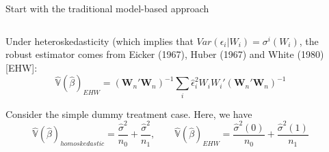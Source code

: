 \documentclass[notes,11pt, aspectratio=169]{beamer}
\newenvironment{wideitemize}{\itemize\addtolength{\itemsep}{10pt}}{\enditemize}
\begin{document}
\begin{frame}{Start with the traditional model-based approach}
\begin{columns}[T] %
\begin{column}{.8\textwidth}
  \begin{wideitemize}
  \item Under heteroskedasticity (which implies that $Var(\epsilon_{i} | W_{i}) = \sigma^{i}(W_{i})$, the robust estimator comes from Eicker (1967), Huber (1967) and White (1980) [EHW]:
    \begin{equation*}
      \hat{\mathbb{V}}(\hat{\beta})_{EHW} = (\mathbf{W}_{n}'\mathbf{W}_{n})^{-1}\sum_{i}\hat{\epsilon}_{i}^{2}W_{i}W_{i}'(\mathbf{W}_{n}'\mathbf{W}_{n})^{-1}
    \end{equation*}
  \item Consider the simple dummy treatment case. Here, we have
    \begin{equation*}
           \hat{\mathbb{V}}(\hat{\beta})_{homoskedastic} = \frac{\hat{\sigma}^{2}}{n_{0}} + \frac{\hat{\sigma}^{2}}{n_{1}}, \qquad \hat{\mathbb{V}}(\hat{\beta})_{EHW} = \frac{\hat{\sigma}^{2}(0)}{n_{0}} + \frac{\hat{\sigma}^{2}(1)}{n_{1}}
         \end{equation*}
  \end{wideitemize}
  \end{column}%
  \hfill%
  \begin{column}{.5\textwidth}
  \end{column}
\end{columns}
  
\end{frame}
\end{document}
